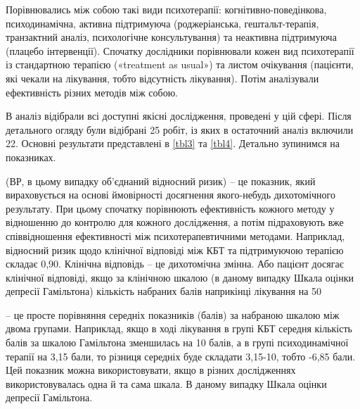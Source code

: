 Порівнювались між собою такі види психотерапії: когнітивно-поведінкова, психодинамічна, активна підтримуюча (роджеріанська, гештальт-терапія, транзактний аналіз, психологічне консультування) та неактивна підтримуюча (плацебо інтервенції). Спочатку дослідники порівнювали кожен вид психотерапії із стандартною терапією («treatment as usual») та листом очікування (пацієнти, які чекали на лікування, тобто відсутність лікування). Потім аналізували ефективність різних методів між собою.

В аналіз відібрали всі доступні якісні дослідження, проведені у цій сфері. Після детального огляду були відібрані 25 робіт, із яких в остаточний аналіз включили 22. Основні результати представлені в 
\ref{tbl3} та 
\ref{tbl4}. Детально зупинимся на показниках.


                  
 (ВР, в цьому випадку об’єднаний відносний ризик) – це показник, який вираховується на основі ймовірності досягнення якого-небудь дихотомічного результату. При цьому спочатку порівнюють ефективність кожного методу у відношенню до контролю для кожного дослідження, а потім підраховують вже співвідношення ефективності між психотерапевтичними методами. Наприклад, відносний ризик щодо клінічної відповіді між КБТ та підтримуючою терапією складає 0,90. Клінічна відповідь – це дихотомічна змінна. Або пацієнт досягає клінічної відповіді, якщо за клінічною шкалою (в даному випадку Шкала оцінки депресії Гамільтона) кількість набраних балів наприкінці лікування на 50%


                  
 – це просте порівняння середніх показників (балів) за набраною шкалою між двома групами. Наприклад, якщо в ході лікування в групі КБТ середня кількість балів за шкалою Гамільтона зменшилась на 10 балів, а в групі психодинамічної терапії на 3,15 бали, то різниця середніх буде складати 3,15-10, тобто -6,85 бали. Цей показник можна використовувати, якщо в різних дослідженнях використовувалась одна й та сама шкала. В даному випадку Шкала оцінки депресії Гамільтона.


